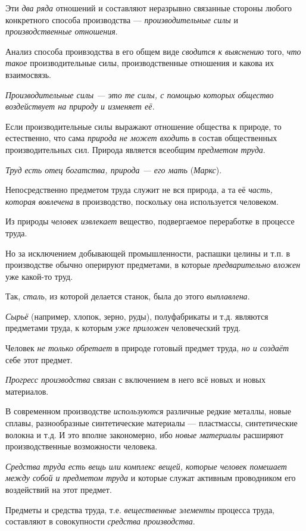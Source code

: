 \documentclass[a4paper,14pt,russian]{extreport}
\begin{document}
Эти \emph{два ряда} отношений и составляют неразрывно связанные стороны любого конкретного способа производства --- \emph{производительные силы} и \emph{производственные отношения}.

Анализ способа проивзодства в его общем виде \emph{сводится к выяснению} того, \emph{что такое} производительные силы, производственные отношения и какова их взаимосвязь.

\emph{Производительные силы --- это те силы, с помощью которых общество воздействует на природу и изменяет её.}

Если производительные силы выражают отношение общества к природе, то естественно, что сама \emph{природа не может входить} в состав общественных производительных сил. Природа является всеобщим \emph{предметом труда}.

\emph{Труд есть отец богатства, природа --- его мать} (\emph{Маркс}).

Непосредственно предметом труда служит не вся природа, а та её \emph{часть, которая вовлечена} в производство, поскольку она используется человеком.

Из природы \emph{человек извлекает} вещество, подвергаемое переработке в процессе труда.

Но за исключением добывающей промышленности, распашки целины и т.п. в производстве обычно оперируют предметами, в которые \emph{предварительно вложен} уже какой-то труд.

Так, \emph{сталь}, из которой делается станок, была до этого \emph{выплавлена}.

\emph{Сырьё} (например, хлопок, зерно, руды), полуфабрикаты и т.д. являются предметами труда, к которым \emph{уже приложен} человеческий труд.

Человек \emph{не только обретает} в природе готовый предмет труда, \emph{но и создаёт} себе этот предмет.

\emph{Прогресс производства} связан с включением в него всё новых и новых материалов.

В современном производстве \emph{используются} различные редкие металлы, новые сплавы, разнообразные синтетические материалы --- пластмассы, синтетические волокна и т.д. И это вполне закономерно, ибо \emph{новые материалы} расширяют производственные возможности человека.

\emph{Средства труда есть вещь или комплекс вещей, которые человек помешает между собой и предметом труда} и которые служат активным проводником его воздействий на этот предмет.

Предметы и средства труда, т.е. \emph{вещественные элементы} процесса труда, составляют в совокупности \emph{средства производства}.
\end{document}
